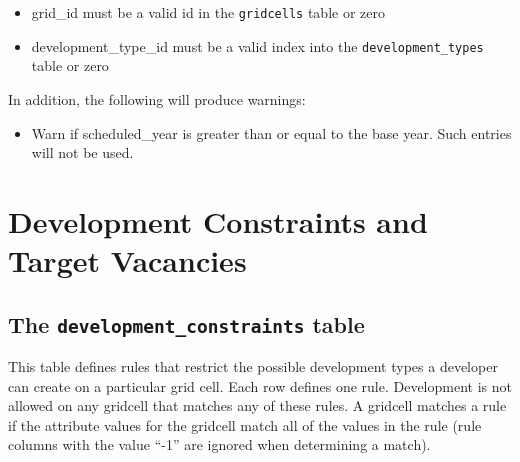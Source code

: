 \begin{itemize} \tight
\item grid_id must be a valid id in the \verb|gridcells| table or zero
\item development_type_id must be a valid index into the \verb|development_types| table or zero
\end{itemize}

In addition, the following will produce warnings:
\begin{itemize} \tight
\item Warn if scheduled_year is greater than or equal to the base year. Such
entries will not be used.
\end{itemize}

\section{Development Constraints and Target Vacancies}
%
\subsection{The {\tt development_constraints} table}

This table defines rules that restrict the possible development types a
developer can create on a particular grid cell.  Each row defines one rule.
Development is not allowed on any gridcell that matches any of these rules.  A
gridcell matches a rule if the attribute values for the gridcell match all of
the values in the rule (rule columns with the value ``-1'' are ignored when
determining a match).

